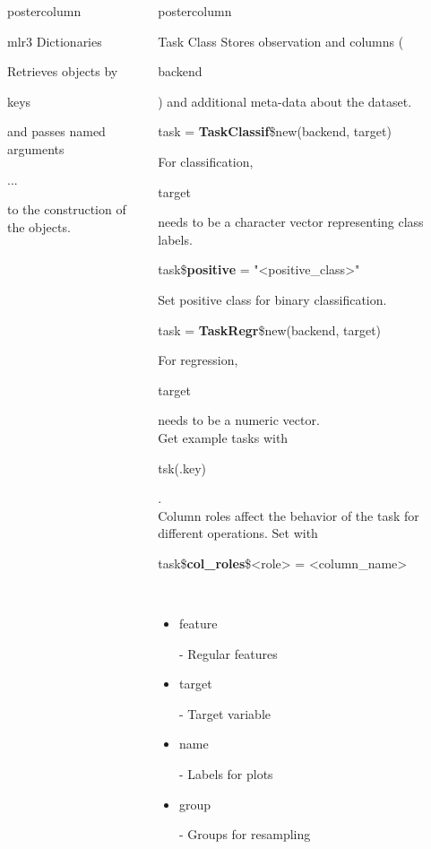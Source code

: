 \documentclass{beamer}
\newlength{\columnheight} %
\newcommand{\codeinline}[1]{\begin{codeboxinline}#1\end{codeboxinline}}
\begin{document}
\begin{frame}[fragile]{}
\begin{columns}
\begin{column}{.245\textwidth}
\begin{beamercolorbox}[center]{postercolumn}
\begin{minipage}{.98\textwidth}
{\begin{myblock}{mlr3 Dictionaries}
\begin{codebox}
							\end{codebox}
							Retrieves objects by \codeinline{keys} and 
							passes named arguments \codeinline{...} to the construction of the objects. 
						\end{myblock}
					}
				\end{minipage}
			\end{beamercolorbox}
		\end{column}
		\begin{column}{.245\textwidth}
			\begin{beamercolorbox}[center]{postercolumn}
				\begin{minipage}{.98\textwidth}
					\parbox[t][\columnheight]{\textwidth}{
					\begin{myblock}{Task Class}
						Stores observation and columns (\codeinline{backend}) and additional
						meta-data about the dataset.
						\\
						\begin{codebox}
							task = \textbf{TaskClassif}\$new(backend, target)
						\end{codebox}
						For classification, \codeinline{target} needs to be a character vector representing class labels.
						\\
						\begin{codebox}
							task\$\textbf{positive} = "<positive\_class>"
						\end{codebox}
						Set positive class for binary classification.
						\\
						\begin{codebox}
							task = \textbf{TaskRegr}\$new(backend, target)
						\end{codebox}
						For regression, \codeinline{target} needs to be a numeric vector.
						\\
                        Get example tasks with \codeinline{tsk(.key)}.
						\vspace{1em}
						\\
						Column roles affect the behavior of the task for different operations. Set with \codeinline{task\$\textbf{col\_roles}\$<role> = <column\_name>}
						\\
						\begin{itemize}
							\item \codeinline{feature} - Regular features
							\item \codeinline{target} - Target variable
							\item \codeinline{name} - Labels for plots
							\item \codeinline{group} -  Groups for resampling

\end{itemize}
\end{myblock}}
\end{minipage}
\end{beamercolorbox}
\end{column}
\end{columns}
\end{frame}
\end{document}
